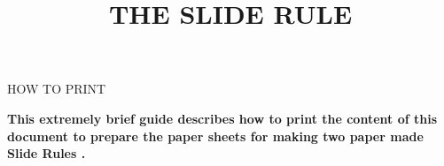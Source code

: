 
\newcommand{\makefulltitle}{How To Print The Slide Rule }



\title{\fontsize{60}{60}\selectfont THE SLIDE RULE}
\preauthor{}\postauthor{}\author{}
\predate{}\postdate{}\date{}


  \begin{center}
    \headingfont\fontsize{32}{32}\selectfont HOW TO PRINT
  \end{center}

  {\let\newpage\relax\maketitle}%
  \nosection{}
  \large\textbf{\makeperex This extremely brief guide describes how to print the content of this document to prepare the paper sheets for making two paper made Slide Rules \modelname.}

